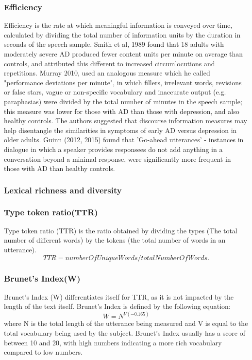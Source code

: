 \documentclass[12pt, twoside, a4paper]{article}
\begin{document}
\subsubsection{Efficiency}
Efficiency is the rate at which meaningful information is conveyed over time, calculated by dividing the total number of information units by the duration in seconds of the speech sample. Smith et al, 1989 found that 18 adults with moderately severe AD produced fewer content units per minute on average than controls, and attributed this different to increased circumlocutions and repetitions. Murray 2010, used an analogous measure which he called "performance deviations per minute", in which fillers, irrelevant words, revisions or false stars, vague or non-specific vocabulary and inaccurate output (e.g. paraphasias) were divided by the total number of minutes in the speech sample; this measure was lower for those with AD than those with depression, and also healthy controls. The authors suggested that discourse information measures may help disentangle the similarities in symptoms of early AD versus depression in older adults. Guinn (2012, 2015) \cite{Guinn2012, Guinn2015} found that 'Go-ahead utterances' - instances in dialogue in which a speaker provides responsees do not add anything in a conversation beyond a minimal response, were significantly more frequent in those with AD than healthy controls.
\subsubsection{Lexical richness and diversity}
\subsubsection{Type token ratio(TTR)}
Type token ratio (TTR) is the ratio obtained by dividing the types (The total number of different words) by the tokens (the total number of words in an utterance).
\begin{equation} \label{x1}
TTR = numberOfUniqueWords / totalNumberOfWords.
\end{equation}
\subsubsection{Brunet's Index(W)} %
Brunet's Index (W) differentiates itself for TTR, as it is not impacted by the length of the text itself. Brunet's Index is defined by the following equation:
\begin{equation} \label{x2}
W = N^{V(-0.165)}
\end{equation}
where N is the total length of the utterance being measured and V is equal to the total vocabulary being used by the subject. Brunet's Index usually has a score of between 10 and 20, with high numbers indicating a more rich vocabulary compared to low numbers. \newline
\par
\end{document}
